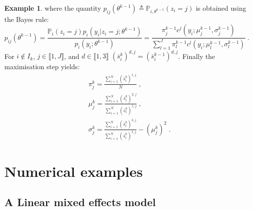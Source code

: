 \documentclass[11pt]{article}
\theoremstyle{plain}
\def\eqs{\;}
\newcommand{\prob}{\mathbb{P}}
\theoremstyle{plain}
\theoremstyle{definition}
\newtheorem{exmp}{Example} %
\begin{document}
\begin{exmp}
where the quantity $p_{ij}(\theta^{k-1}) \triangleq \prob_{i,\theta^{k-1}}(z_i = j)$ is obtained using the Bayes rule:
\begin{equation}\label{gmm:condexpect}
p_{ij}(\theta^{k-1}) =\frac{\prob_i(z_i = j)p_i(y_i|z_i=j;\theta^{k-1})}{p_i(y_i; \theta^{k-1})}=\frac{\pi_j^{k-1} c^j(y_i;\mu^{k-1}_j,\sigma^{k-1}_j)}{\sum_{l=1}^{J}\pi_l^{k-1}c^l(y_i;\mu_l^{k-1}, \sigma_l^{k-1})}\eqs.
\end{equation}
For $i \notin I_k$, $j \in \llbracket 1, J \rrbracket$, and $d \in \llbracket 1,3 \rrbracket$ $(\bar{s}_i^k)^{d,j} = (\bar{s}_i^{k-1})^{d,j}$.
Finally the maximisation step yields:
\begin{align}
& \pi_j^k = \frac{\sum_{i=1}^{N}{(\bar{s}_i^k)^{1,j}}}{N}\eqs,\\
& \mu_j^k = \frac{\sum_{i=1}^{N}{(\bar{s}_i^k)^{2,j}}}{\sum_{i=1}^{N}{(\bar{s}_i^k)^{1,j}}} \eqs,\\
& \sigma_j^k = \frac{\sum_{i=1}^{N}{(\bar{s}_i^k)^{3,j}}}{\sum_{i=1}^{N}{(\bar{s}_i^k)^{1,j}}} - (\mu_j^k)^2\eqs.
\end{align}
\end{exmp}
\newpage


\section{Numerical examples}\label{sec:numerical}
\subsection{A Linear mixed effects model}
\end{document}
